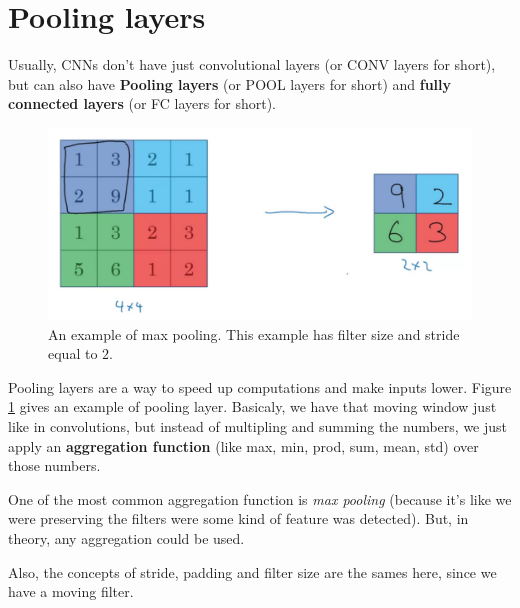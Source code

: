 \documentclass[12pt, a4paper, oneside]{book}
\begin{document}
\section{Pooling layers}%
\label{sec:pooling_layers}

Usually, CNNs don't have just convolutional layers (or CONV layers for short),
but can also have \textbf{Pooling layers} (or POOL layers for short) and
\textbf{fully connected layers} (or FC layers for short).

\begin{figure}[h]
\centering
\includegraphics[scale=0.3]{Res/max-pooling.png}
\caption{An example of max pooling. This example has filter size and stride
equal to $2$.}
\label{max-pooling.png}
\end{figure}

Pooling layers are a way to speed up computations and make inputs lower. Figure
\ref{max-pooling.png} gives an example of pooling layer. Basicaly, we have that
moving window just like in convolutions, but instead of multipling and summing
the numbers, we just apply an \textbf{aggregation function} (like max, min,
prod, sum, mean, std) over those numbers.

One of the most common aggregation function is \textit{max pooling} (because
it's like we were preserving the filters were some kind of feature was
detected). But, in theory, any aggregation could be used.

Also, the concepts of stride, padding and filter size are the sames here, since
we have a moving filter.


\end{document}
